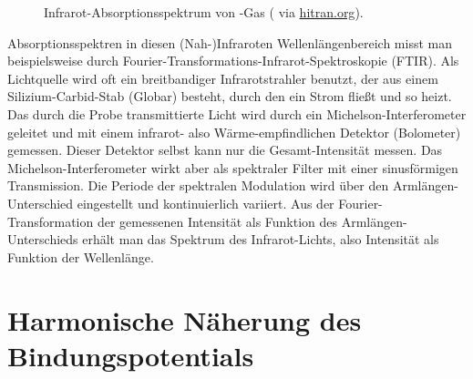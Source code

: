 \begin{figure}
\caption{Infrarot-Absorptionsspektrum von -Gas  (\cite{Maki_1995_HCN} via \href{https://hitran.org}{hitran.org}).
\label{fig:vib_hcn}}
\end{figure}




Absorptionsspektren in diesen (Nah-)Infraroten Wellenlängenbereich misst man beispielsweise durch Fourier-Transformations-Infrarot-Spektroskopie (FTIR). Als Lichtquelle wird oft ein breitbandiger Infrarotstrahler benutzt, der aus einem Silizium-Carbid-Stab (Globar) besteht, durch den ein Strom fließt und so heizt. Das durch die Probe transmittierte Licht wird durch ein Michelson-Interferometer geleitet und mit einem infrarot-  also Wärme-empfindlichen Detektor (Bolometer) gemessen. Dieser Detektor selbst kann nur die Gesamt-Intensität messen. Das Michelson-Interferometer wirkt aber als spektraler Filter mit einer sinusförmigen Transmission. Die Periode der spektralen Modulation wird über den Armlängen-Unterschied eingestellt und kontinuierlich variiert. Aus der Fourier-Transformation der gemessenen Intensität als Funktion des Armlängen-Unterschieds erhält man das Spektrum des Infrarot-Lichts, also Intensität als Funktion der Wellenlänge.



\section{Harmonische Näherung des Bindungspotentials}

\begin{marginfigure}
\caption{Die Eigenfunktionen des quantenmechanischen harmonischen Oszillators für $\nu = 0 \dots 5$ (dünne Linie) und die Aufenthaltswahrscheinlichkeit (gefüllte Kurven). Die Position in y-Richtung entspricht der Eigen-Energie des Zustands auf der Skala des parabelförmigen Bindungspotentials im Hintergrund.
\label{fig:vib_1d_WF}}
\end{marginfigure}

